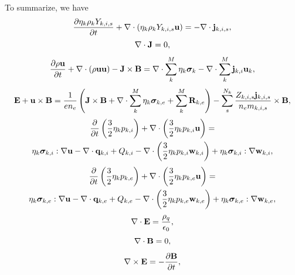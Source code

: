 \documentclass[a4paper,11pt]{report}
\begin{document}
To summarize, we have
\begin{equation}
    \label{eq:sf_mm_ms_ni}
    \frac{\partial \eta_k \rho_k Y_{k,i,s}}{\partial t} + \nabla \cdot \left( \eta_k \rho_k Y_{k,i,s} \mathbf{u} \right) = -\nabla \cdot \mathbf{j}_{k,i,s},
\end{equation}
\begin{equation}
    \label{eq:sf_mm_ms_ne}
    \nabla \cdot \mathbf{J} = 0,
\end{equation}
\begin{equation}
    \label{eq:sf_mm_ms_ui}
    \frac{\partial \rho \mathbf{u}}{\partial t} + \nabla \cdot \left( \rho \mathbf{u} \mathbf{u} \right) - \mathbf{J} \times \mathbf{B} = \nabla \cdot \sum_k^M \eta_k \bm \sigma_k - \nabla \cdot \sum_k^M \mathbf{j}_{k,i} \mathbf{u}_{k},
\end{equation}
\begin{equation}
    \label{eq:sf_mm_ms_ue}
    \mathbf{E} + \mathbf{u} \times \mathbf{B} = \frac{1}{e n_e} \left( \mathbf{J} \times \mathbf{B} + \nabla \cdot \sum_k^M \eta_k \bm \sigma_{k,e} + \sum_k^M \mathbf{R}_{k,e} \right) - \sum_s^{N_k} \frac{Z_{k,i,s} \mathbf{j}_{k,i,s}}{n_e m_{k,i,s}} \times \mathbf{B},
\end{equation}
\begin{multline}
    \label{eq:sf_mm_ms_iei}
    \frac{\partial}{\partial t} \left( \frac{3}{2} \eta_k p_{k,i} \right) + \nabla \cdot \left( \frac{3}{2} \eta_k p_{k,i} \mathbf{u} \right) = \\
    \eta_k \bm \sigma_{k,i} : \nabla \mathbf{u} - \nabla \cdot \mathbf{q}_{k,i} + Q_{k,i} - \nabla \cdot \left( \frac{3}{2} \eta_k p_{k,i} \mathbf{w}_{k,i} \right) + \eta_k \bm \sigma_{k,i} : \nabla \mathbf{w}_{k,i},
\end{multline}
\begin{multline}
    \label{eq:sf_mm_ms_iee}
    \frac{\partial}{\partial t} \left( \frac{3}{2} \eta_k p_{k,e} \right) + \nabla \cdot \left( \frac{3}{2} \eta_k p_{k,e} \mathbf{u} \right) = \\
    \eta_k \bm \sigma_{k,e} : \nabla \mathbf{u} - \nabla \cdot \mathbf{q}_{k,e} + Q_{k,e} - \nabla \cdot \left( \frac{3}{2} \eta_k p_{k,e} \mathbf{w}_{k,e} \right) + \eta_k \bm \sigma_{k,e} : \nabla \mathbf{w}_{k,e},
\end{multline}
\begin{equation}
    \label{eq:sf_mm_ms_maxwell_3}
    \nabla \cdot \mathbf{E} = \frac{\rho_q}{\epsilon_0},
\end{equation}
\begin{equation}
    \label{eq:sf_mm_ms_maxwell_4}
    \nabla \cdot \mathbf{B} = 0,
\end{equation}
\begin{equation}
    \label{eq:sf_mm_ms_maxwell_1}
    \nabla \times \mathbf{E} = -\frac{ \partial \mathbf{B}}{\partial t},
\end{equation}
\end{document}
